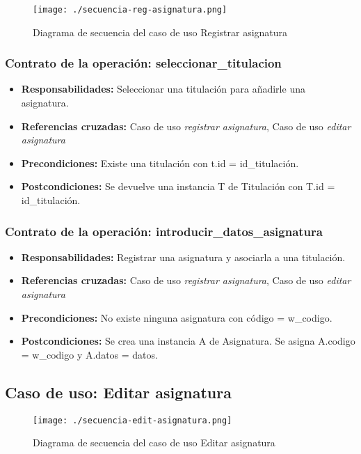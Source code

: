 \begin{figure}[H] 
  \label{comportamiento-reg-asignatura} 
	\begin{center}
    \texttt{[image: ./secuencia-reg-asignatura.png]}
  \end{center}
\caption{Diagrama de secuencia del caso de uso Registrar asignatura}
\end{figure}

\subsubsection{Contrato de la operación: seleccionar\_titulacion}
\begin{itemize}
\item {\bf Responsabilidades:} Seleccionar una titulación para añadirle una asignatura.
\item {\bf Referencias cruzadas:} Caso de uso {\em registrar asignatura}, Caso de uso {\em editar asignatura}
\item {\bf Precondiciones:} Existe una titulación con t.id = id\_titulación.
\item {\bf Postcondiciones:} Se devuelve una instancia T de Titulación con T.id = id\_titulación.
\end{itemize}

\subsubsection{Contrato de la operación: introducir\_datos\_asignatura}
\begin{itemize}
\item {\bf Responsabilidades:} Registrar una asignatura y asociarla a una titulación.
\item {\bf Referencias cruzadas:} Caso de uso {\em registrar asignatura}, Caso de uso {\em editar asignatura}
\item {\bf Precondiciones:} No existe ninguna asignatura con código = w\_codigo.
\item {\bf Postcondiciones:} Se crea una instancia A de Asignatura. Se asigna A.codigo = w\_codigo y A.datos = datos.
\end{itemize}

\subsection{Caso de uso: Editar asignatura}
\begin{figure}[H] 
  \label{comportamiento-edit-asignatura} 
	\begin{center}
    \texttt{[image: ./secuencia-edit-asignatura.png]}
  \end{center}
\caption{Diagrama de secuencia del caso de uso Editar asignatura}
\end{figure}

